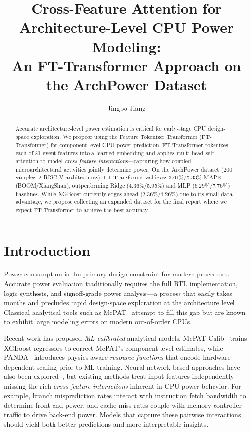 \documentclass[10pt,twocolumn,letterpaper]{article}
\title{Cross-Feature Attention for Architecture-Level CPU Power Modeling:\\An FT-Transformer Approach on the ArchPower Dataset}
\author{Jingbo Jiang}
\begin{document}
\maketitle

\begin{abstract}
Accurate architecture-level power estimation is critical for early-stage
CPU design-space exploration.  We propose using the Feature Tokenizer
Transformer (FT-Transformer) for component-level CPU power prediction.
FT-Transformer tokenizes each of 81 event features into a learned
embedding and applies multi-head self-attention to model
\emph{cross-feature interactions}---capturing how coupled
microarchitectural activities jointly determine power.
On the ArchPower dataset (200 samples, 2 RISC-V architectures),
FT-Transformer achieves 3.61\%/5.33\% MAPE (BOOM/XiangShan), outperforming
Ridge (4.36\%/5.95\%) and MLP (6.29\%/7.76\%) baselines.  While XGBoost
currently edges ahead (2.36\%/4.26\%) due to its small-data advantage,
we propose collecting an expanded dataset for the final report where we
expect FT-Transformer to achieve the best accuracy.
\end{abstract}

\section{Introduction}

Power consumption is the primary design constraint for modern processors.
Accurate power evaluation traditionally requires the full RTL
implementation, logic synthesis, and signoff-grade power analysis—a process
that easily takes months and precludes rapid design-space exploration at
the architecture level~\cite{zhang2025archpower}.  Classical analytical
tools such as McPAT~\cite{li2009mcpat} attempt to fill this gap but are
known to exhibit large modeling errors on modern out-of-order CPUs.

Recent work has proposed \emph{ML-calibrated} analytical models.
McPAT-Calib~\cite{zhai2021mcpat_calib} trains XGBoost regressors to correct
McPAT's component-level estimates, while PANDA~\cite{zhang2023panda}
introduces physics-aware \emph{resource functions} that encode
hardware-dependent scaling prior to ML training.  Neural-network-based
approaches have also been explored~\cite{zhai2023neural_power}, but
existing methods treat input features independently—missing the rich
\emph{cross-feature interactions} inherent in CPU power behavior.  For
example, branch misprediction rates interact with instruction fetch
bandwidth to determine front-end power, and cache miss rates couple with
memory controller traffic to drive back-end power.  Models that capture
these pairwise interactions should yield both better predictions and more
interpretable insights.
\end{document}

